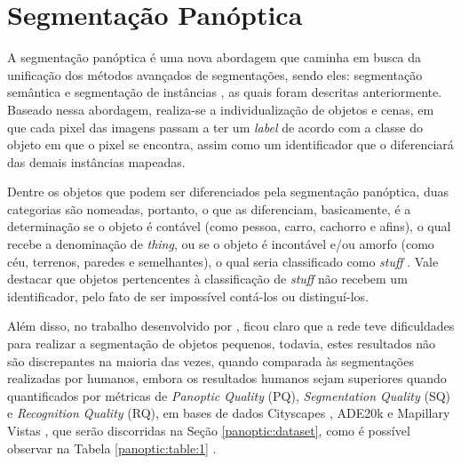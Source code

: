\newpage
\clearpage
\section{Segmentação Panóptica}
\label{panoptic:panoptic}
A segmentação panóptica \cite{Kirillov2019a} é uma nova abordagem que caminha em busca da unificação dos métodos avançados de segmentações, sendo eles: segmentação semântica e segmentação de instâncias \cite{He2020}, as quais foram descritas anteriormente. Baseado nessa abordagem, realiza-se a individualização de objetos e cenas, em que cada pixel das imagens passam a ter um \textit{label} de acordo com a classe do objeto em que o pixel se encontra, assim como um identificador que o diferenciará das demais instâncias mapeadas.

Dentre os objetos que podem ser diferenciados pela segmentação panóptica, duas categorias são nomeadas, portanto, o que as diferenciam, basicamente, é a determinação se o objeto é contável (como pessoa, carro, cachorro e afins), o qual  recebe a denominação de \textit{thing}, ou se o objeto é incontável e/ou amorfo (como céu, terrenos, paredes e semelhantes), o qual seria classificado como \textit{stuff} \cite{Kirillov2019a, Liu2019, Mohan2020}. Vale destacar que objetos pertencentes à classificação de \textit{stuff} não recebem um identificador, pelo fato de ser impossível contá-los ou distinguí-los.

Além disso, no trabalho desenvolvido por \cite{Kirillov2019a}, ficou claro que a rede teve dificuldades para realizar a segmentação de objetos pequenos, todavia, estes resultados não são discrepantes na maioria das vezes, quando comparada às segmentações realizadas por humanos, embora os resultados humanos sejam superiores quando quantificados por métricas de \textit{Panoptic Quality} (PQ), \textit{Segmentation Quality} (SQ) e \textit{Recognition Quality} (RQ), em bases de dados Cityscapes \cite{Cordts2016}, ADE20k \cite{Zhou2016} e Mapillary Vistas \cite{Neuhold2017_ICCV}, que serão discorridas na Seção \ref{panoptic:dataset}, como é possível observar na Tabela \ref{panoptic:table:1} \cite{Kirillov2019a}.

